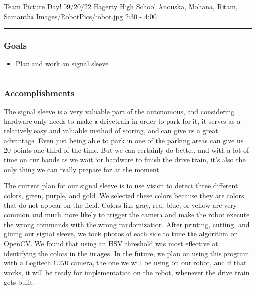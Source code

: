 \insertmeeting 
	{Team Picture Day!} 
	{09/20/22}
	{Hagerty High School}
	{Anouska, Mohana, Ritam, Samantha}
	{Images/RobotPics/robot.jpg}
	{2:30 - 4:00}
	
\noindent\hfil\rule{\textwidth}{.4pt}\hfil
\subsubsection*{Goals}
\begin{itemize}
    \item Plan and work on signal sleeve

\end{itemize} 

\noindent\hfil\rule{\textwidth}{.4pt}\hfil

\subsubsection*{Accomplishments}
The signal sleeve is a very valuable part of the autonomous, and considering hardware only needs to make a drivetrain in order to park for it, it serves as a relatively easy and valuable method of scoring, and can give us a great advantage. Even just being able to park in one of the parking areas can give us 20 points one third of the time. But we can certainly do better, and with a lot of time on our hands as we wait for hardware to finish the drive train, it's also the only thing we can really prepare for at the moment.

The current plan for our signal sleeve is to use vision to detect three different colors, green, purple, and gold. We selected these colors because they are colors that do not appear on the field. Colors like gray, red, blue, or yellow are very common and much more likely to trigger the camera and make the robot execute the wrong commands with the wrong randomization. After printing, cutting, and gluing our signal sleeve, we took photos of each side to tune the algorithm on OpenCV. We found that using an HSV threshold was most effective at identifying the colors in the images. In the future, we plan on using this program with a Logitech C270 camera, the one we will be using on our robot, and if that works, it will be ready for implementation on the robot, whenever the drive train gets built.







